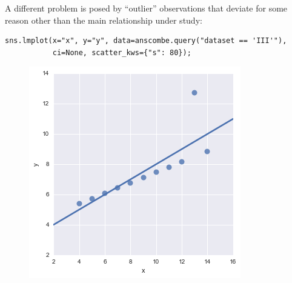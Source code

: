 \documentclass{beamer}
\begin{document}
\begin{frame}[fragile]
	\large
A different problem is posed by “outlier” observations that deviate for some reason other than the main relationship under study:
\begin{framed}
\begin{verbatim}
sns.lmplot(x="x", y="y", data=anscombe.query("dataset == 'III'"),
           ci=None, scatter_kws={"s": 80});
               \end{verbatim}
            \end{framed}
\begin{figure}
	\centering
	\includegraphics[width=0.7\linewidth]{images/regression_25_0}
\end{figure}


\end{frame}
\end{document}
